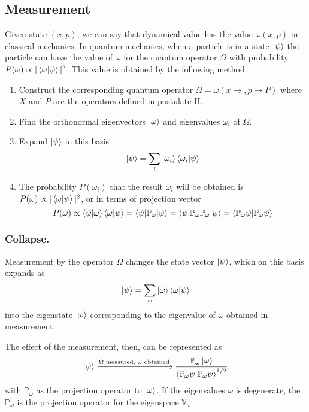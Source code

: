 \documentclass[../../../main.tex]{subfiles}
\begin{document}
\subsection{Measurement}
Given state $(x,p)$, we can say that dynamical value has the value $\omega(x,p)$ in classical mechanics.
In quantum mechanics, when a particle is in a state $\ket{\psi } $ the particle can have the value of $\omega$ for the quantum operator $\Omega$ with probability $P(\omega)\propto|\braket{\omega|\psi}  |^2$. 
This value is obtained by the following method.
\begin{enumerate}
    \item Construct the corresponding quantum operator $\Omega=\omega(x \rightarrow ,p \rightarrow P)$ where $X$ and $P$ are the operators defined in postulate II.
    \item Find the orthonormal eigenvectors $\ket{\omega} $ and eigenvalues $\omega_i$ of $\Omega$.
    \item Expand $\ket{\psi } $ in this basis
    \begin{equation*}
        \ket{\psi }=\sum_i  \ket{\omega_i } \braket{\omega_i |\psi}  
    \end{equation*}
    \item The probability $P(\omega_i)$ that the result $\omega_i$ will be obtained is $P(\omega)\propto|\braket{\omega|\psi}  |^2$, or in terms of projection vector
    \begin{equation*}
        P(\omega)\propto \braket{\psi|\omega } \braket{\omega|\psi}=\braket{\psi|\mathbb{P}_\omega|\psi  }=\braket{\psi|\mathbb{P } _\omega \mathbb{P } _\omega |\psi   }=\braket{\mathbb{P } _\omega \psi| \mathbb{P } _\omega \psi  }    
    \end{equation*}
\end{enumerate}

\subsubsection{Collapse.}
Measurement by the operator $\Omega$ changes the state vector $\ket{\psi}$, which on this basis expands as 
\begin{equation*}
    \ket{\psi}=\sum_\omega \ket{\omega}\braket{\omega|\psi}
\end{equation*}
into the eigenstate $\ket{\omega}$ corresponding to the eigenvalue of $\omega$  obtained in measurement.

The effect of the measurement, then, can be represented as 
\begin{equation*}
    \ket{\psi}\xrightarrow{\Omega\text{ measured, }\omega\text{ obtained}}\frac{\mathbb{P}_\omega \ket{\omega }}{\braket{\mathbb{P}_\omega\psi|\mathbb{P }_\omega \psi}^{1/2}}
\end{equation*}
with $\mathbb{P }_\omega$ as the projection operator to $\ket{\omega}$. 
If the eigenvalues $\omega$ is degenerate, the $\mathbb{P }_\omega$ is the projection operator for the eigenspace $\mathbb{V}_\omega$. 
\end{document}
